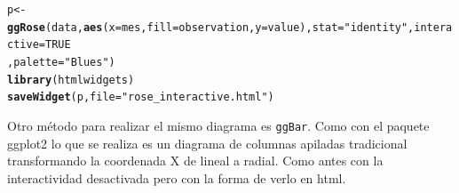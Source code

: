 \documentclass{article}\usepackage[]{graphicx}\usepackage[]{color}
\makeatletter
\newcommand{\hlnum}[1]{\textcolor[rgb]{0.686,0.059,0.569}{#1}}%
\newcommand{\hlstr}[1]{\textcolor[rgb]{0.192,0.494,0.8}{#1}}%
\newcommand{\hlstd}[1]{\textcolor[rgb]{0.345,0.345,0.345}{#1}}%
\newcommand{\hlkwb}[1]{\textcolor[rgb]{0.69,0.353,0.396}{#1}}%
\newcommand{\hlkwc}[1]{\textcolor[rgb]{0.333,0.667,0.333}{#1}}%
\newcommand{\hlkwd}[1]{\textcolor[rgb]{0.737,0.353,0.396}{\textbf{#1}}}%
\newenvironment{kframe}{%
 \def\at@end@of@kframe{}%
 \ifinner\ifhmode%
  \def\at@end@of@kframe{\end{minipage}}%
  \begin{minipage}{\columnwidth}%
 \fi\fi%
 \def\FrameCommand##1{\hskip\@totalleftmargin \hskip-\fboxsep
 \colorbox{shadecolor}{##1}\hskip-\fboxsep
     \hskip-\linewidth \hskip-\@totalleftmargin \hskip\columnwidth}%
 \MakeFramed {\advance\hsize-\width
   \@totalleftmargin\z@ \linewidth\hsize
   \@setminipage}}%
 {\par\unskip\endMakeFramed%
 \at@end@of@kframe}
\newenvironment{knitrout}{}{} %
\makeatother
\begin{document}
\begin{knitrout}
\color{fgcolor}\begin{kframe}
\begin{alltt}
\hlstd{p} \hlkwb{<-} \hlkwd{ggRose}\hlstd{(data,}\hlkwd{aes}\hlstd{(}\hlkwc{x}\hlstd{=mes,}\hlkwc{fill}\hlstd{=observation,}\hlkwc{y}\hlstd{=value),}\hlkwc{stat}\hlstd{=}\hlstr{"identity"}\hlstd{,}\hlkwc{interactive}\hlstd{=}\hlnum{TRUE}
       \hlstd{,} \hlkwc{palette} \hlstd{=} \hlstr{"Blues"}\hlstd{)}
\hlkwd{library}\hlstd{(htmlwidgets)}
\hlkwd{saveWidget}\hlstd{(p,} \hlkwc{file} \hlstd{=} \hlstr{"rose_interactive.html"}\hlstd{)}
\end{alltt}
\end{kframe}
\end{knitrout}
\clearpage
Otro m\'etodo para realizar el mismo diagrama es \texttt{ggBar}. Como con el paquete ggplot2 lo que se realiza es un diagrama de columnas apiladas tradicional transformando la coordenada X de lineal a radial. Como antes con la interactividad desactivada pero con la forma de verlo en html.
\end{document}
